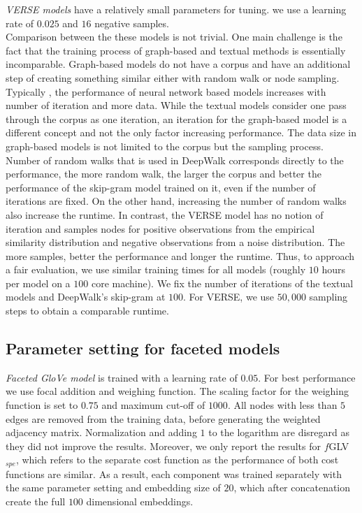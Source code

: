 \noindent
\emph{VERSE models} have a relatively small parameters for tuning. we use a learning rate of $0.025$ and $16$ negative samples.\\

\noindent
Comparison between the these models is not trivial. One main challenge is the fact that the training process of graph-based and textual methods is essentially incomparable. Graph-based models do not have a corpus and have an additional step of creating something similar either with random walk or node sampling. Typically , the performance of neural network based models increases with number of iteration and more data. While the textual models consider one pass through the corpus as one iteration, an iteration for the graph-based model is a different concept and not the only factor increasing performance. The data size in graph-based models is not limited to the corpus but the sampling process. Number of random walks that is used in DeepWalk corresponds directly to the performance, the more random walk, the larger the corpus and better the performance of the skip-gram model trained on it, even if the number of iterations are fixed. On the other hand, increasing the number of random walks also increase the runtime. In contrast, the VERSE model has no notion of iteration and samples nodes for positive observations from the empirical similarity distribution and negative observations from a  noise distribution. The more samples, better the performance and longer the runtime. Thus, to approach a fair evaluation, we use similar training times for all models (roughly $10$ hours per model on a $100$ core machine). We fix the number of iterations of the textual models and DeepWalk's skip-gram at $100$. For VERSE, we use $50,000$ sampling steps to obtain a comparable runtime.
\subsection{Parameter setting for faceted models}
\emph{Faceted GloVe model} is trained with a learning rate of $0.05$. For best performance we use focal addition and weighing function. The scaling factor for the weighing function is set to $0.75$ and maximum cut-off of $1000$. All nodes with less than $5$ edges are removed from the training data, before generating the weighted adjacency matrix. Normalization and adding $1$ to the logarithm are disregard as they did not improve the results. Moreover, we only report the results for $f$GLV$_{spe}$, which refers to the separate cost function as the performance of both cost functions are similar. As a result, each component was trained separately with the same parameter setting and embedding size of $20$, which after concatenation create the full $100$ dimensional embeddings. \\

